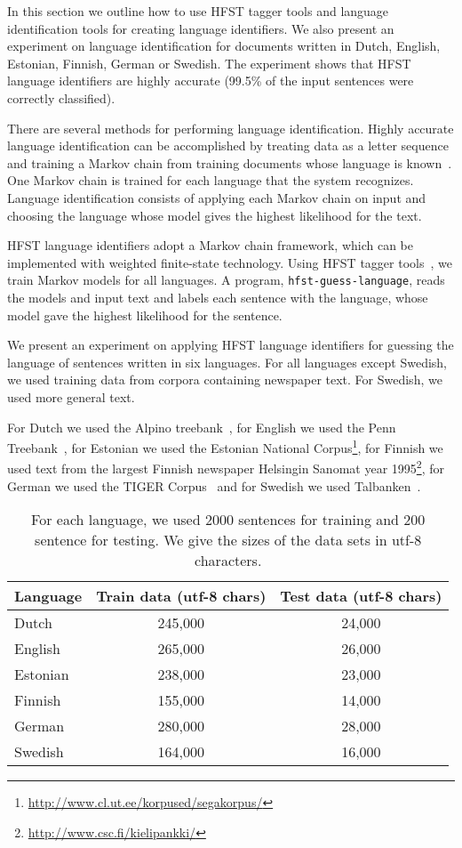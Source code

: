 \documentclass{llncs}
\begin{document}
In this section we outline how to use HFST tagger tools and language
identification tools for creating language identifiers. We also
present an experiment on language identification for documents written
in Dutch, English, Estonian, Finnish, German or Swedish. The
experiment shows that HFST language identifiers are highly accurate
(99.5\% of the input sentences were correctly classified).

There are several methods for performing language
identification. Highly accurate language identification can be
accomplished by treating data as a letter sequence and training
a Markov chain from training documents whose language is
known~\cite{cavnar/1994}. One Markov chain is trained for each
language that the system recognizes. Language identification consists
of applying each Markov chain on input and choosing the language whose
model gives the highest likelihood for the text. 

HFST language identifiers adopt a Markov chain framework, which can be
implemented with weighted finite-state technology. Using HFST tagger
tools~\cite{silfverberg/2011}, we train Markov models for all
languages. A program, {\tt hfst-guess-language}, reads the
models and input text and labels each sentence with the language,
whose model gave the highest likelihood for the sentence.

We present an experiment on applying HFST language identifiers for
guessing the language of sentences written in six languages. For all
languages except Swedish, we used training data from corpora
containing newspaper text. For Swedish, we used more general text.

For Dutch we used the Alpino treebank~\cite{bouma/2000}, for English
we used the Penn Treebank~\cite{marcus/1993}, for Estonian we used the
Estonian National
Corpus\footnote{\url{http://www.cl.ut.ee/korpused/segakorpus/}}, for
Finnish we used text from the largest Finnish newspaper Helsingin
Sanomat year 1995\footnote{\url{http://www.csc.fi/kielipankki/}}, for
German we used the TIGER Corpus~\cite{brants/2002} and for Swedish we
used Talbanken~\cite{einarsson/1976}.

\begin{table}
\small
\begin{center}
\caption{For each language, we used 2000 sentences for training and
  200 sentence for testing. We give the sizes of the data sets in
  utf-8 characters.}\label{tab:lang-id-data}
\begin{tabular}{l|cc}
Language & Train data (utf-8 chars) & Test data (utf-8 chars)\\
\hline
Dutch    & 245,000  & 24,000\\
English  & 265,000  & 26,000\\
Estonian & 238,000  & 23,000\\
Finnish  & 155,000  & 14,000\\
German   & 280,000  & 28,000\\
Swedish  & 164,000  & 16,000\\
\end{tabular}
\end{center}
\end{table}
\end{document}
